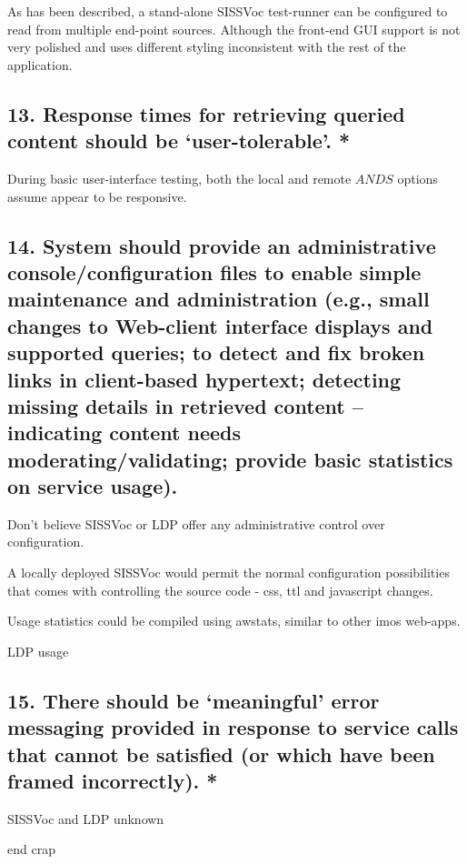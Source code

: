 \documentclass[10pt,a4paper]{article}
\begin{document}
\begin{flushleft}
As has been described, a stand-alone SISSVoc test-runner can be configured to
read from multiple end-point sources. Although the front-end GUI support is not
very polished and uses different styling inconsistent with the rest of the
application.


\subsection{ 
13. Response times for retrieving queried content should be ‘user-tolerable’. *
}

During basic user-interface testing, both the local and remote \(ANDS\) options assume appear to be 
responsive. 



\subsection{  14. System should provide an administrative console/configuration
files to enable simple maintenance and administration (e.g., small changes to
Web-client interface displays and supported queries; to detect and fix broken
links in client-based hypertext; detecting missing details in retrieved content
– indicating content needs moderating/validating; provide basic statistics on
service usage).
}

Don't believe SISSVoc or LDP offer any administrative control over configuration. 

A locally deployed SISSVoc would permit the normal configuration possibilities that comes with controlling the
source code - css, ttl and javascript changes.

Usage statistics could be compiled using awstats, similar to other imos
web-apps. 

LDP usage 


\subsection{ 
15. There should be ‘meaningful’ error messaging provided in response to
service calls that cannot be satisfied (or which have been framed incorrectly).
* }

SISSVoc and LDP unknown 





\clearpage



end crap

  \end{flushleft}
\end{document}
